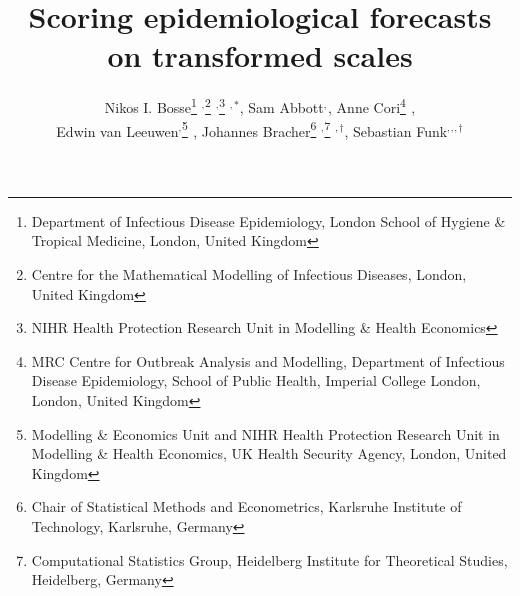 \documentclass{article}
\begin{document}
\title{Scoring epidemiological forecasts on transformed scales}
  \author{Nikos I. Bosse\thanks{Department of Infectious Disease Epidemiology, London School of Hygiene \& Tropical Medicine, London, United Kingdom} $^{,}$\thanks{Centre for the Mathematical Modelling of Infectious Diseases, London, United Kingdom} $^{,}$\thanks{NIHR Health Protection Research Unit in Modelling \& Health Economics} $^{,*}$,  
  Sam Abbott\footnotemark[1] $^{,}$\footnotemark[2]$ ^{}$, 
  Anne Cori\thanks{MRC Centre for Outbreak Analysis and Modelling, Department of Infectious Disease Epidemiology, School of Public Health, Imperial College London, London, United Kingdom} $^{}$, \\
  Edwin van Leeuwen\footnotemark[1] $^{,}$\thanks{Modelling \& Economics Unit and NIHR Health Protection Research Unit in Modelling \& Health Economics, UK Health Security Agency, London, United Kingdom} $^{}$, 
  Johannes Bracher\thanks{Chair of Statistical Methods and Econometrics, Karlsruhe Institute of Technology, Karlsruhe, Germany } $^{,}$\thanks{Computational Statistics Group, Heidelberg Institute for Theoretical Studies, Heidelberg, Germany } $^{, \dagger}$, 
  Sebastian Funk\footnotemark[1] $^{, }$\footnotemark[2] $^{, }$\footnotemark[3] $ ^{, \dagger}$}
\end{document}
